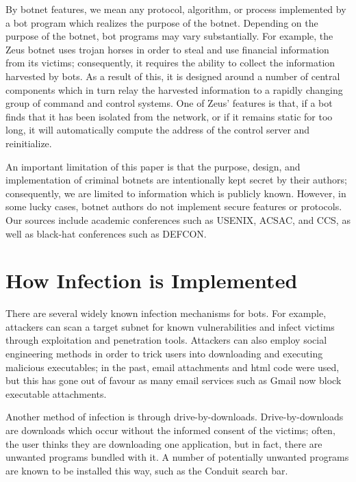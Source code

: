 \documentclass{acm_proc_article-sp}
\begin{document}
By botnet features, we mean any protocol, algorithm, or process implemented by a bot program which realizes the purpose of the botnet.  Depending on the purpose of the botnet, bot programs may vary substantially.  For example, the Zeus botnet uses trojan horses in order to steal and use financial information from its victims; consequently, it requires the ability to collect the information harvested by bots.  As a result of this, it is designed around a number of central components which in turn relay the harvested information to a rapidly changing group of command and control systems. One of Zeus' features is that, if a bot finds that it has been isolated from the network, or if it remains static for too long, it will automatically compute the address of the control server and reinitialize.

An important limitation of this paper is that the purpose, design, and implementation of criminal botnets are intentionally kept secret by their authors; consequently, we are limited to information which is publicly known. However, in some lucky cases, botnet authors do not implement secure features or protocols. Our sources include academic conferences such as USENIX, ACSAC,  and CCS, as well as black-hat conferences such as DEFCON.  


\section{How Infection is Implemented}

There are several widely known infection mechanisms for bots.  For example, attackers can scan a target subnet for known vulnerabilities and infect victims through exploitation and penetration tools\cite{feily:detection}.  Attackers can also employ social engineering methods in order to trick users into downloading and executing malicious executables; in the past, email attachments and html code were used, but this has gone out of favour as many email services such as Gmail now block executable attachments.

Another method of infection is through drive-by-downloads.  Drive-by-downloads are downloads which occur without the informed consent of the victims; often, the user thinks they are downloading one application, but in fact, there are unwanted programs bundled with it. A number of potentially unwanted programs are known to be installed this way, such as the Conduit search bar.
\end{document}
